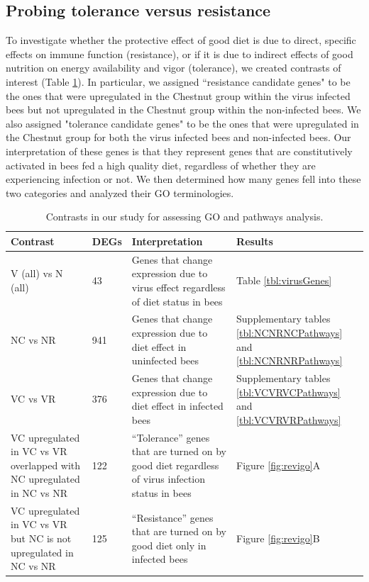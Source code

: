 \documentclass[11pt,a4paper,oldfontcommands,openany]{memoir}
\numberwithin{equation}{section} %
\begin{document}
\subsection{Probing tolerance versus resistance}

To investigate whether the protective effect of good diet is due to direct, specific effects on immune function (resistance), or if it is due to indirect effects of good nutrition on energy availability and vigor (tolerance), we created contrasts of interest (Table \ref{tbl:contrasts}). In particular, we assigned ``resistance candidate genes" to be the ones that were upregulated in the Chestnut group within the virus infected bees but not upregulated in the Chestnut group within the non-infected bees. We also assigned "tolerance candidate genes" to be the ones that were upregulated in the Chestnut group for both the virus infected bees and non-infected bees. Our interpretation of these genes is that they represent genes that are constitutively activated in bees fed a high quality diet, regardless of whether they are experiencing infection or not. We then determined how many genes fell into these two categories and analyzed their GO terminologies.

\begin{table}[H]
\begin{tabular}{ | m{4.4cm} | m{0.9cm}| m{5.5cm} | m{2.6cm} | } 
\hline
Contrast & DEGs & Interpretation & Results \\ 
\hline
V (all) vs N (all) & 43 & Genes that change expression due to virus effect regardless of diet status in bees & Table \ref{tbl:virusGenes} \\ 
\hline
NC vs NR & 941 & Genes that change expression due to diet effect in uninfected bees & Supplementary tables \ref{tbl:NCNRNCPathways} and \ref{tbl:NCNRNRPathways} \\ 
\hline
VC vs VR & 376 & Genes that change expression due to diet effect in infected bees & Supplementary tables \ref{tbl:VCVRVCPathways} and \ref{tbl:VCVRVRPathways} \\ 
\hline
VC upregulated in VC vs VR overlapped with NC upregulated in NC vs NR & 122 & ``Tolerance'' genes that are turned on by good diet regardless of virus infection status in bees & Figure \ref{fig:revigo}A \\
\hline
VC upregulated in VC vs VR but NC is not upregulated in NC vs NR & 125 & ``Resistance'' genes that are turned on by good diet only in infected bees & Figure \ref{fig:revigo}B \\
\hline
\end{tabular}
\caption{Contrasts in our study for assessing GO and pathways analysis.}
  \label{tbl:contrasts}
\end{table}
\end{document}

